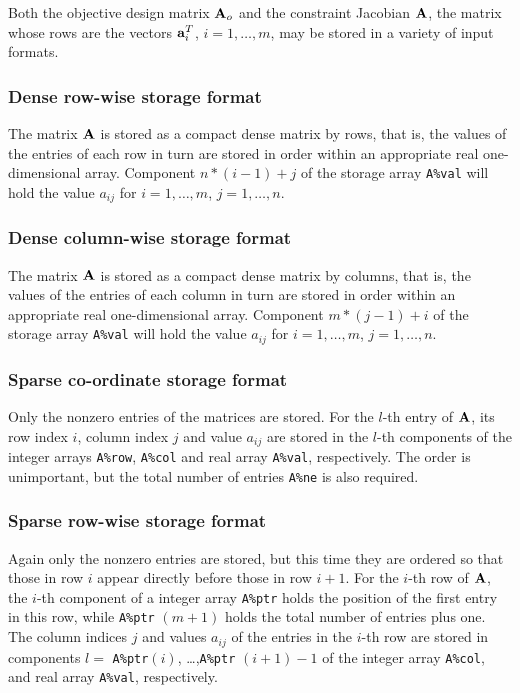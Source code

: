 \documentclass{galahad}
\begin{document}

\galmatrix
Both the objective design matrix ${\mathbf{A}}_o$ and
the constraint Jacobian ${\mathbf{A}}$, the matrix
whose rows are the vectors ${\mathbf{a}}_{i}^{T}$, $i = 1, \ldots , m$,
may be stored in a variety of input formats.

\subsubsection{Dense row-wise storage format}\label{dense}
The matrix ${\mathbf{A}}$ is stored as a compact
dense matrix by rows, that is, the values of the entries of each row in turn are
stored in order within an appropriate real one-dimensional array.
Component $n \ast (i-1) + j$ of the storage array {\tt A\%val} will hold the
value $a_{ij}$ for $i = 1, \ldots , m$, $j = 1, \ldots , n$.

\subsubsection{Dense column-wise storage format}\label{densecolumnwise}
The matrix ${\mathbf{A}}$ is stored as a compact
dense matrix by columns, that is, the values of the entries of each column
in turn are stored in order within an appropriate real one-dimensional array.
Component $m \ast (j-1) + i$ of the storage array {\tt A\%val} will hold the
value $a_{ij}$ for $i = 1, \ldots , m$, $j = 1, \ldots , n$.

\subsubsection{Sparse co-ordinate storage format}\label{coordinate}
Only the nonzero entries of the matrices are stored. For the
$l$-th entry of ${\mathbf{A}}$, its row index $i$, column index $j$
and value $a_{ij}$
are stored in the $l$-th components of the integer arrays {\tt A\%row},
{\tt A\%col} and real array {\tt A\%val}, respectively.
The order is unimportant, but the total
number of entries {\tt A\%ne} is also required.

\subsubsection{Sparse row-wise storage format}\label{rowwise}
Again only the nonzero entries are stored, but this time
they are ordered so that those in row $i$ appear directly before those
in row $i+1$. For the $i$-th row of ${\mathbf{A}}$, the $i$-th component of a
integer array {\tt A\%ptr} holds the position of the first entry in this row,
while {\tt A\%ptr} $(m+1)$ holds the total number of entries plus one.
The column indices $j$ and values $a_{ij}$ of the entries in the $i$-th row
are stored in components
$l =$ {\tt A\%ptr}$(i)$, \ldots ,{\tt A\%ptr} $(i+1)-1$ of the
integer array {\tt A\%col}, and real array {\tt A\%val}, respectively.
\end{document}
